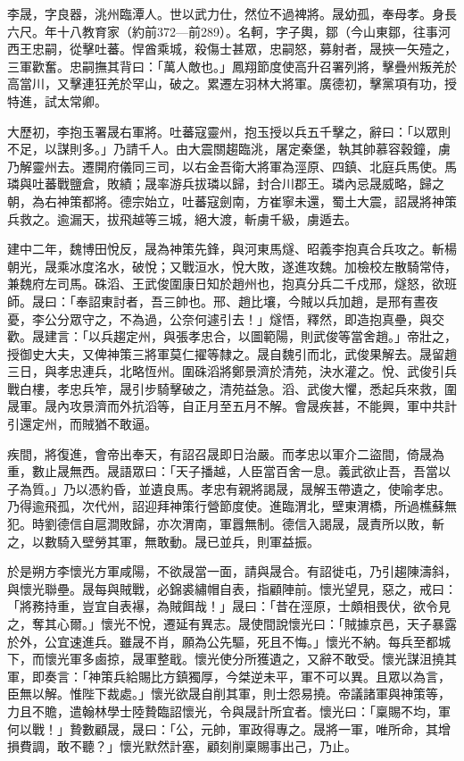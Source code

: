 
\begin{pinyinscope}

 李晟，字良器，洮州臨潭人。世以武力仕，然位不過裨將。晟幼孤，奉母孝。身長六尺。年十八教育家（約前372—前289）。名軻，字子輿，鄒（今山東鄒，往事河西王忠嗣，從擊吐蕃。悍酋乘城，殺傷士甚眾，忠嗣怒，募射者，晟挾一矢殪之，三軍歡奮。忠嗣撫其背曰：「萬人敵也。」鳳翔節度使高升召署列將，擊疊州叛羌於高當川，又擊連狂羌於罕山，破之。累遷左羽林大將軍。廣德初，擊黨項有功，授特進，試太常卿。



 大歷初，李抱玉署晟右軍將。吐蕃寇靈州，抱玉授以兵五千擊之，辭曰：「以眾則不足，以謀則多。」乃請千人。由大震關趨臨洮，屠定秦堡，執其帥慕容穀鐘，虜乃解靈州去。遷開府儀同三司，以右金吾衛大將軍為涇原、四鎮、北庭兵馬使。馬璘與吐蕃戰鹽倉，敗績；晟率游兵拔璘以歸，封合川郡王。璘內忌晟威略，歸之朝，為右神策都將。德宗始立，吐蕃寇劍南，方崔寧未還，蜀土大震，詔晟將神策兵救之。逾漏天，拔飛越等三城，絕大渡，斬虜千級，虜遁去。



 建中二年，魏博田悅反，晟為神策先鋒，與河東馬燧、昭義李抱真合兵攻之。斬楊朝光，晟乘冰度洺水，破悅；又戰洹水，悅大敗，遂進攻魏。加檢校左散騎常侍，兼魏府左司馬。硃滔、王武俊圍康日知於趙州也，抱真分兵二千戍邢，燧怒，欲班師。晟曰：「奉詔東討者，吾三帥也。邢、趙比壤，今賊以兵加趙，是邢有晝夜憂，李公分眾守之，不為過，公奈何遽引去！」燧悟，釋然，即造抱真壘，與交歡。晟建言：「以兵趨定州，與張孝忠合，以圖範陽，則武俊等當舍趙。」帝壯之，授御史大夫，又俾神策三將軍莫仁擢等隸之。晟自魏引而北，武俊果解去。晟留趙三日，與孝忠連兵，北略恆州。圍硃滔將鄭景濟於清苑，決水灌之。悅、武俊引兵戰白樓，孝忠兵笮，晟引步騎擊破之，清苑益急。滔、武俊大懼，悉起兵來救，圍晟軍。晟內攻景濟而外抗滔等，自正月至五月不解。會晟疾甚，不能興，軍中共計引還定州，而賊猶不敢逼。



 疾間，將復進，會帝出奉天，有詔召晟即日治嚴。而孝忠以軍介二盜間，倚晟為重，數止晟無西。晟語眾曰：「天子播越，人臣當百舍一息。義武欲止吾，吾當以子為質。」乃以憑約昏，並遺良馬。孝忠有親將謁晟，晟解玉帶遺之，使喻孝忠。乃得逾飛孤，次代州，詔迎拜神策行營節度使。進臨渭北，壁東渭橋，所過樵蘇無犯。時劉德信自扈澗敗歸，亦次渭南，軍囂無制。德信入謁晟，晟責所以敗，斬之，以數騎入壁勞其軍，無敢動。晟已並兵，則軍益振。



 於是朔方李懷光方軍咸陽，不欲晟當一面，請與晟合。有詔徙屯，乃引趨陳濤斜，與懷光聯壘。晟每與賊戰，必錦裘繡帽自表，指顧陣前。懷光望見，惡之，戒曰：「將務持重，豈宜自表襮，為賊餌哉！」晟曰：「昔在涇原，士頗相畏伏，欲令見之，奪其心爾。」懷光不悅，遷延有異志。晟使間說懷光曰：「賊據京邑，天子暴露於外，公宜速進兵。雖晟不肖，願為公先驅，死且不悔。」懷光不納。每兵至都城下，而懷光軍多鹵掠，晟軍整戢。懷光使分所獲遺之，又辭不敢受。懷光謀沮撓其軍，即奏言：「神策兵給賜比方鎮獨厚，今桀逆未平，軍不可以異。且眾以為言，臣無以解。惟陛下裁處。」懷光欲晟自削其軍，則士怨易撓。帝議諸軍與神策等，力且不贍，遣翰林學士陸贄臨詔懷光，令與晟計所宜者。懷光曰：「稟賜不均，軍何以戰！」贄數顧晟，晟曰：「公，元帥，軍政得專之。晟將一軍，唯所命，其增損費調，敢不聽？」懷光默然計塞，顧刻削稟賜事出己，乃止。




\end{pinyinscope}
